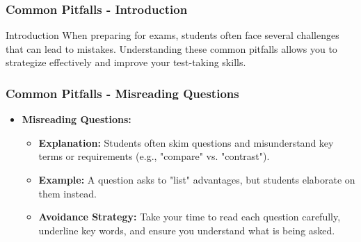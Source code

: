 \documentclass{beamer}
\begin{document}
\begin{frame}[fragile]
    \frametitle{Common Pitfalls - Introduction}
    \begin{block}{Introduction}
        When preparing for exams, students often face several challenges that can lead to mistakes. 
        Understanding these common pitfalls allows you to strategize effectively and improve your test-taking skills.
    \end{block}
\end{frame}

\begin{frame}[fragile]
    \frametitle{Common Pitfalls - Misreading Questions}
    \begin{itemize}
        \item \textbf{Misreading Questions:}
        \begin{itemize}
            \item \textbf{Explanation:} Students often skim questions and misunderstand key terms or requirements (e.g., "compare" vs. "contrast").
            \item \textbf{Example:} A question asks to "list" advantages, but students elaborate on them instead.
            \item \textbf{Avoidance Strategy:} Take your time to read each question carefully, underline key words, and ensure you understand what is being asked.
        \end{itemize}
    \end{itemize}
\end{frame}
\end{document}

